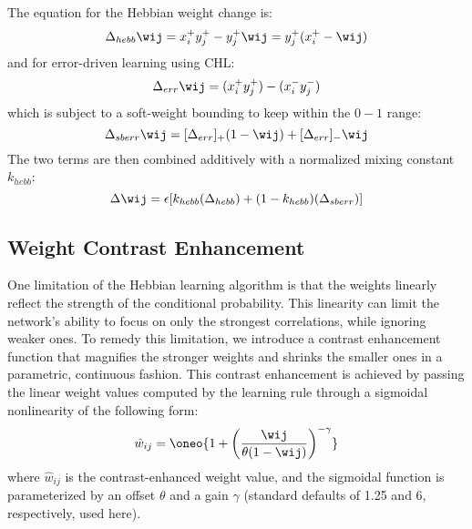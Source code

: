 The equation for the Hebbian weight change is:
\begin{equation}
  \Delta_{hebb} \wij = x^+_i y^+_j - y^+_j \wij = y^+_j (x^+_i - \wij)
  \label{eq.hebb}
\end{equation}
and for error-driven learning using CHL:
\begin{equation}
  \Delta_{err} \wij = (x^+_i y^+_j) - (x^-_i y^-_j)
  \label{eq.err}
\end{equation}
which is subject to a soft-weight bounding to keep within the $0-1$
range:
\begin{equation}
  \Delta_{sberr} \wij = [\Delta_{err}]_+ (1-\wij) + [\Delta_{err}]_- \wij
  \label{eq.err_soft_bound}
\end{equation}
The two terms are then combined additively with a normalized mixing
constant $k_{hebb}$:
\begin{equation}
  \Delta \wij = \epsilon[k_{hebb} (\Delta_{hebb}) + (1-k_{hebb}) (\Delta_{sberr})]
  \label{eq.k_hebb}
\end{equation}

\subsection{Weight Contrast Enhancement} 

One limitation of the Hebbian learning algorithm is that the weights
linearly reflect the strength of the conditional probability.  This
linearity can limit the network's ability to focus on only the
strongest correlations, while ignoring weaker ones.  To remedy this
limitation, we introduce a contrast enhancement function that
magnifies the stronger weights and shrinks the smaller ones in a
parametric, continuous fashion.  This contrast enhancement is achieved
by passing the linear weight values computed by the learning rule
through a sigmoidal nonlinearity of the following form:
\begin{equation}
  \hat{w}_{ij} = \oneo{1 + \left(\frac{\wij}{\theta (1-\wij)}\right)^{-\gamma}}
  \label{eq.wt_off}
\end{equation}
where $\hat{w}_{ij}$ is the contrast-enhanced weight value, and the
sigmoidal function is parameterized by an offset $\theta$ and a gain
$\gamma$ (standard defaults of 1.25 and 6, respectively, used here).  

